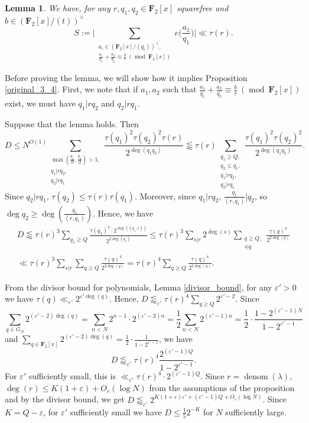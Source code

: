 \documentclass[11pt, reqno]{amsart}
\newtheorem{lemma}[theorem]{Lemma}
\numberwithin{equation}{section}
\newcommand{\zff}{\mathbf{F}_2[x]}
\newcommand{\zffmi}[1]{(\zff/(#1))^{\times}}
\newcommand{\zffmodinvt}{\zffmi{t}}
\newcommand\eps{\varepsilon}
\newcommand\denom{\operatorname{denom}}
\newcommand\modd{\operatorname{mod}}
\begin{document}
\begin{lemma}
\label{main_lemma_for_34}
    We have, for any $r, q_1, q_2 \in \zff$ squarefree and $b \in \zffmodinvt$
    $$S := \bigg| \sum_{\substack{a_i \in \zffmi{q_i},\\ \frac{a_1}{q_1}+\frac{a_2}{q_2} \equiv \frac{b}{r} \ (\modd \ \zff)}} e\Big( \frac{a_1}{q_1} \Big) \bigg| \ll \tau(r).$$
\end{lemma}

Before proving the lemma, we will show how it implies Proposition \ref{original_3_4}. First, we note that if $a_1, a_2$ such that $\frac{a_1}{q_1}+\frac{a_2}{q_2} \equiv \frac{b}{r} \ (\modd \ \zff)$ exist, we must have $q_1 | rq_2$ and $q_2 | rq_1$.

Suppose that the lemma holds. Then
$$D \leqslant N^{O(1)} \sum_{\substack{\max(\frac{q_1}{R}, \frac{q_2}{Q}) > 1, \\ q_1|rq_2, \\ q_2 | rq_1}} \frac{\tau(q_1)^2\tau(q_2)^2\tau(r)}{2^{\deg( q_1q_2 )}} \lessapprox \tau(r) \sum_{\substack{q_1 \geqslant Q, \\ q_2 \leqslant q_1, \\ q_1|rq_2, \\ q_2 | rq_1}}\frac{\tau(q_1)^2\tau(q_2)^2}{2^{\deg( q_1q_2 )}}.$$
Since $q_2 | rq_1$, $\tau(q_2)\leqslant \tau(r)\tau(q_1)$. Moreover, since $q_1|rq_2$, $\frac{q_1}{(r, q_1)}|q_2$, so $\deg q_2 \geqslant \deg(\frac{q_1}{(r, q_1)} )$. Hence, we have
\begin{multline*}
    D \lessapprox \tau(r)^{3} \sum_{q_1 \geqslant Q} \frac{\tau(q_1)^{4} \cdot2^{\deg ((q_1, r))}}{2^{2\deg( q_1 )}} \leqslant \tau(r)^{3} \sum_{s | r} 2^{\deg (s)} \sum_{\substack{q \geqslant Q, \\ s|q}}\frac{\tau(q)^{4}}{ 2^{2\deg( q )}} \\ \ll \tau(r)^{3} \sum_{s|r} \sum_{q \geqslant Q} \frac{\tau(q)^{4}}{2^{2\deg(q)}} = \tau(r)^{4} \sum_{q \geqslant Q} \frac{\tau(q)^{4}}{2^{2\deg(q)}}.
\end{multline*}

From the divisor bound for polynomials, Lemma \ref{divisor_bound}, for any $\eps'>0$ we have $\tau(q) \ll_{\eps'} 2^{\eps'\deg (q)}$. Hence, $D \lessapprox_{\eps'} \tau(r)^{4}\sum_{q \geqslant Q}2^{\eps'-2}$. Since
$$\sum_{q \in G_N} 2^{(\eps'-2)\deg (q)}=\sum_{n < N}2^{n-1} \cdot 2^{(\eps'-2)n}=\frac{1}{2}\sum_{n<N}2^{(\eps'-1)n}=\frac{1}{2} \cdot \frac{1-2^{(\eps'-1)N}}{1-2^{\eps'-1}}$$
and $\sum_{q \in \zff} 2^{(\eps'-2)\deg(q)} = \frac{1}{2} \cdot \frac{1}{1-2^{\eps'-1}}$, we have
$$D \lessapprox_{\eps'} \tau(r)^{4} \frac{2^{(\eps'-1)Q}}{1-2^{\eps'-1}}.$$
For $\eps'$ sufficiently small, this is $\ll_{\eps'} \tau(r)^{4} \cdot 2^{(\eps'-1)Q}$. Since $r=\denom(\lambda)$, $\deg(r) \leqslant K(1+\eps) +O_{\eps}(\log N)$ from the assumptions of the proposition and by the divisor bound, we get $D \lessapprox_{\eps'} 2^{K(1+\eps)\eps'+(\eps'-1)Q + O_{\eps}(\log N)}$. Since $K=Q-\eps$, for $\eps'$ sufficiently small we have $D \leqslant \frac{1}{5}2^{-K}$ for $N$ sufficiently large.
\end{document}
